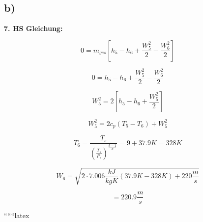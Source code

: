 

\subsection*{b)}

\textbf{7. HS Gleichung:}

\[
0 = m_{ges} \left[ h_5 - h_6 + \frac{W_5^2}{2} - \frac{W_6^2}{2} \right]
\]

\[
0 = h_5 - h_6 + \frac{W_5^2}{2} - \frac{W_6^2}{2}
\]

\[
W_5^2 = 2 \left[ h_5 - h_6 + \frac{W_5^2}{2} \right]
\]

\[
W_5^2 = 2 c_p \left( T_5 - T_6 \right) + W_5^2
\]

\[
T_6 = \frac{T_s}{\left( \frac{T_s}{P_s} \right)^{\frac{k-1}{k}}} = 9 + 37.9K = 328K
\]

\[
W_6 = \sqrt{2 \cdot 7.006 \frac{kJ}{kgK} \left( 37.9K - 328K \right) + 220 \frac{m}{s}}
\]

\[
= 220.9 \frac{m}{s}
\]

``````latex